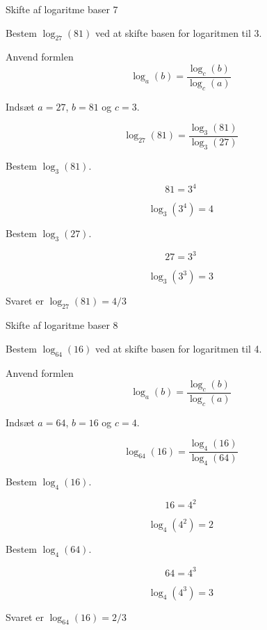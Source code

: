 \documentclass{article}
\begin{document}
\newpage
\begin{exercise}{Skifte af logaritme baser 7}

Bestem $\log_{27}(81)$ ved at skifte basen for logaritmen til 3.


\hint

Anvend formlen
\[
\log_a(b) = \frac{\log_c(b)}{\log_c(a)}
\]

\hint

Indsæt $a=27$, $b=81$ og $c=3$.

\hint
\[
\log_{27}(81) = \frac{\log_3(81)}{\log_3(27)}
\]

\hint
Bestem $\log_3(81)$.

\hint
\[
81 = 3^4
\]


\hint
\[
\log_3(3^4) = 4
\]

\hint
Bestem $\log_3(27)$.

\hint
\[
27 = 3^3
\]

\hint
\[
\log_3(3^3) = 3
\]

\hint
Svaret er $\log_{27}(81) = 4/3$


\end{exercise}

\newpage
\begin{exercise}{Skifte af logaritme baser 8}

Bestem $\log_{64}(16)$ ved at skifte basen for logaritmen til 4.


\hint

Anvend formlen
\[
\log_a(b) = \frac{\log_c(b)}{\log_c(a)}
\]

\hint

Indsæt $a=64$, $b=16$ og $c=4$.

\hint
\[
\log_{64}(16) = \frac{\log_4(16)}{\log_4(64)}
\]

\hint
Bestem $\log_4(16)$.

\hint
\[
16 = 4^2
\]


\hint
\[
\log_4(4^2) = 2
\]

\hint
Bestem $\log_4(64)$.

\hint
\[
64 = 4^3
\]

\hint
\[
\log_4(4^3) = 3
\]

\hint
Svaret er $\log_{64}(16) = 2/3$


\end{exercise}

\newpage
\end{document}
